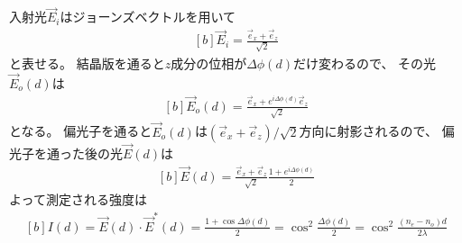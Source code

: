 \documentclass[../ap_2008.tex]{subfiles}
\begin{document}
\section{}
入射光\(\vec{E}_{i}\)はジョーンズベクトルを用いて
\begin{equation}\begin{aligned}[b]
    \vec{E}_{i} = \frac{\vec{e}_x+\vec{e}_z}{\sqrt{2}}
\end{aligned}\end{equation}
と表せる。
結晶版を通ると\(z\)成分の位相が\(\Delta\phi(d)\)だけ変わるので、
その光\(\vec{E}_o(d)\)は
\begin{equation}\begin{aligned}[b]
    \vec{E}_{o}(d) = \frac{\vec{e}_x+e^{i\Delta\phi(d)}\vec{e}_z}{\sqrt{2}}
\end{aligned}\end{equation}
となる。
偏光子を通ると\(\vec{E}_o(d)\)は\((\vec{e}_x+\vec{e}_z)/\sqrt{2}\)方向に射影されるので、
偏光子を通った後の光\(\vec{E}(d)\)は
\begin{equation}\begin{aligned}[b]
    \vec{E}(d) = \frac{\vec{e}_x+\vec{e}_z}{\sqrt{2}}\frac{1+e^{i\Delta\phi(d)}}{2}
\end{aligned}\end{equation}
よって測定される強度は
\begin{equation}\begin{aligned}[b]
    I(d) = \vec{E}(d)\cdot\vec{E}^*(d) = \frac{1+\cos\Delta\phi(d)}{2}
    =\cos^2\frac{\Delta\phi(d)}{2} = \cos^2 \frac{(n_e-n_o)d}{2\lambda}
\end{aligned}\end{equation}
\end{document}
